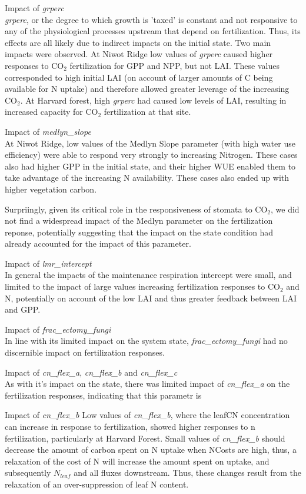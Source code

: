 \documentclass[draft,linenumbers]{agujournal}
\begin{document}
Impact of \emph{grperc}\\
\emph{grperc}, or the degree to which growth is 'taxed' is constant and not responsive to any of the physiological processes upstream that depend on fertilization. Thus, its effects are all likely due to indirect impacts on the initial state. Two main impacts were observed. At Niwot Ridge low values of \emph{grperc} caused higher responses to CO$_{2}$ fertilization for GPP and NPP, but not LAI. These values corresponded to high initial LAI (on account of larger amounts of C being available for N uptake) and therefore allowed greater leverage of the increasing CO$_{2}$.  At Harvard forest, high \emph{grperc} had caused low levels of LAI, resulting in increased capacity for CO$_{2}$ fertilization at that site.

Impact of \emph{medlyn\_slope}\\
At Niwot Ridge, low values of the Medlyn Slope parameter (with high water use efficiency) were able to respond very strongly to increasing Nitrogen. These cases also had higher GPP in the initial state, and their higher WUE enabled them to take advantage of the increasing N availability.   These cases also ended up with higher vegetation carbon. 

Surpriingly, given its critical role in the responsiveness of stomata to CO$_{2}$, we did not find a widespread impact of the Medlyn parameter on the fertilization reponse, potentially suggesting that the impact on the state condition had already accounted for the impact of this parameter. 

Impact of \emph{lmr\_intercept}\\
In general the impacts of the maintenance respiration intercept were small, and limited to the impact of large values increasing fertilization responses to CO$_{2}$ and N, potentially on account of the low LAI and thus greater feedback between LAI and GPP. 

Impact of \emph{frac\_ectomy\_fungi}\\
In line with its limited impact on the system state, \emph{frac\_ectomy\_fungi} had no discernible impact on fertilization responses. 

Impact of \emph{cn\_flex\_a}, \emph{cn\_flex\_b} and \emph{cn\_flex\_c}\\
As with it's impact on the state, there was limited impact of \emph{cn\_flex\_a} on the fertilization responses, indicating that this parametr is 

Impact of \emph{cn\_flex\_b}
Low values of \emph{cn\_flex\_b}, where the leafCN concentration can increase in response to fertilization, showed higher responses to n fertilization, particularly at Harvard Forest. Small values of  \emph{cn\_flex\_b} should  decrease the amount of carbon spent on N uptake when NCosts are high, thus, a relaxation of the cost of N will increase the amount spent on uptake, and subsequently $N_{leaf}$ and all fluxes downstream.  Thus, these changes result from the relaxation of an over-suppression of leaf N content. 
\end{document}
